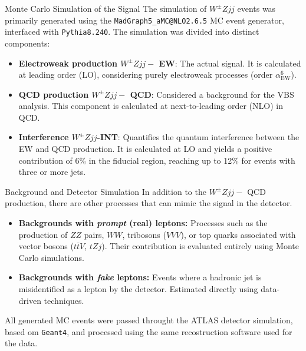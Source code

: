 \documentclass{beamer}
\newcommand{\wzjjew}{$W^\pm Z jj-$ EW}
\newcommand{\wzjjqcd}{$W^\pm Z jj-$ QCD}
\newcommand{\wzjj}{$W^\pm Z jj$}
\begin{document}
\begin{frame}[noframenumbering]{Monte Carlo Simulation of the Signal}
The simulation of $W^\pm Zjj$ events was primarily generated using the \texttt{MadGraph5\_aMC@NLO2.6.5} MC event generator, interfaced with \texttt{Pythia8.240}. The simulation was divided into distinct components:
\begin{itemize}
    \item \textbf{Electroweak production \wzjjew}: The actual signal. It is calculated at leading order (LO), considering purely electroweak processes (order $\alpha_\text{EW}^6$).
    \item \textbf{QCD production \wzjjqcd}: Considered a background for the VBS analysis. This component is calculated at next-to-leading order (NLO) in QCD.
    \item \textbf{Interference \wzjj-INT}: Quantifies the quantum interference between the EW and QCD production. It is calculated at LO and yields a positive contribution of 6\% in the fiducial region, reaching up to 12\% for events with three or more jets.
\end{itemize}
\end{frame}

\begin{frame}[noframenumbering]{Background and Detector Simulation}
    In addition to the \wzjjqcd  \,production, there are other processes that can mimic the signal in the detector.
    \begin{itemize}
    \item \textbf{Backgrounds with \textit{prompt} (real) leptons:} Processes such as the production of $ZZ$ pairs, $WW$, tribosons ($VVV$), or top quarks associated with vector bosons ($t\bar{t}V$, $tZj$). Their contribution is evaluated entirely using Monte Carlo simulations.
    \item \textbf{Backgrounds with \textit{fake} leptons:} Events where a hadronic jet is misidentified as a lepton by the detector. Estimated directly using data-driven techniques.
\end{itemize}
    All generated MC events were passed throught the ATLAS detector simulation, based om \texttt{Geant4}, and processed using the same recostruction software used for the data.

\end{frame}
\end{document}
